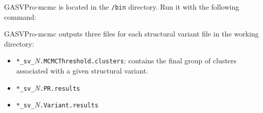\documentclass[11pt]{article}
\begin{document}
\noindent GASVPro-mcmc is located in the \verb+/bin+ directory. Run it with the following command:
\begin{framed}
\end{framed}

\noindent GASVPro-mcmc outputs three files for each structural variant file in the working directory: 
\begin{itemize}
	\item[] \verb+*_sv_+{\em N}\verb+.MCMCThreshold.clusters+: contains the final group of clusters associated with a given structural variant.
	\item[] \verb+*_sv_+{\em N}\verb+.PR.results+
	\item[] \verb+*_sv_+{\em N}\verb+.Variant.results+
\end{itemize}
\end{document}
